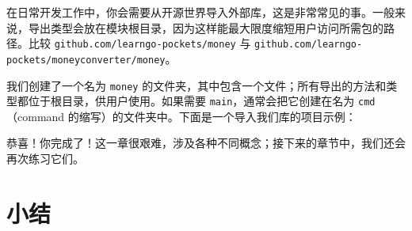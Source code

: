 在日常开发工作中，你会需要从开源世界导入外部库，这是非常常见的事。一般来说，导出类型会放在模块根目录，因为这样能最大限度缩短用户访问所需包的路径。比较 \texttt{github.com/learngo-pockets/money} 与 \texttt{github.com/learngo-pockets/moneyconverter/money}。

我们创建了一个名为 \texttt{money} 的文件夹，其中包含一个文件；所有导出的方法和类型都位于根目录，供用户使用。如果需要 \texttt{main}，通常会把它创建在名为 \texttt{cmd}（command 的缩写）的文件夹中。下面是一个导入我们库的项目示例：

\begin{treebox}
\end{treebox}

恭喜！你完成了！这一章很艰难，涉及各种不同概念；接下来的章节中，我们还会再次练习它们。

\section*{小结}

